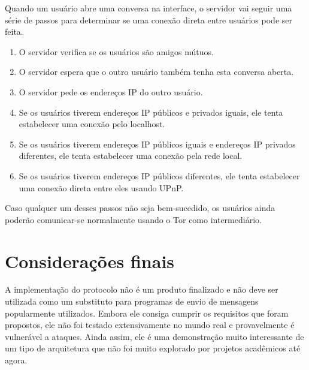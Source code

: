 Quando um usuário abre uma conversa na interface, o servidor vai seguir uma série de passos para determinar se uma conexão direta entre usuários pode ser feita.
\begin{enumerate}
    \item O servidor verifica se os usuários são amigos mútuos.
    \item O servidor espera que o outro usuário também tenha esta conversa aberta.
    \item O servidor pede os endereços IP do outro usuário.
    \item Se os usuários tiverem endereços IP públicos e privados iguais, ele tenta estabelecer uma conexão pelo localhost.
    \item Se os usuários tiverem endereços IP públicos iguais e endereços IP privados diferentes, ele tenta estabelecer uma conexão pela rede local.
    \item Se os usuários tiverem endereços IP públicos diferentes, ele tenta estabelecer uma conexão direta entre eles usando UPnP.
\end{enumerate}

Caso qualquer um desses passos não seja bem-sucedido, os usuários ainda poderão comunicar-se normalmente usando o Tor como intermediário.

\section{Considerações finais}

A implementação do protocolo não é um produto finalizado e não deve ser utilizada como um substituto para programas de envio de mensagens popularmente utilizados. Embora ele consiga cumprir os requisitos que foram propostos, ele não foi testado extensivamente no mundo real e provavelmente é vulnerável a ataques. Ainda assim, ele é uma demonstração muito interessante de um tipo de arquitetura que não foi muito explorado por projetos acadêmicos até agora.